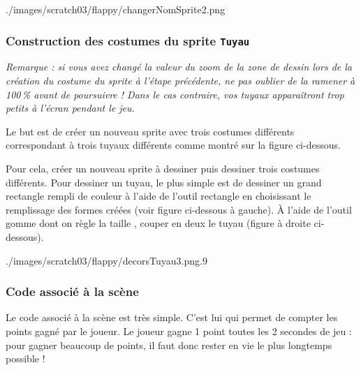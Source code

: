%
	      {./images/scratch03/flappy/changerNomSprite2.png}{\textwidth}


\subsubsection{Construction des costumes du sprite \texttt{Tuyau}}\label{costumesLutinTuyau} 

\emph{Remarque : si vous avez changé la valeur du zoom de la zone de dessin lors de la création du costume du sprite à l'étape précédente, ne pas oublier de la ramener à 100\,\% avant de poursuivre ! Dans le cas contraire, vos tuyaux apparaîtront trop petits à l'écran pendant le jeu.}

\vspace{6pt}

Le but est de créer un nouveau sprite avec trois costumes différents correspondant à trois tuyaux différents comme montré sur la figure ci-dessous.



Pour cela, créer un nouveau sprite à dessiner puis dessiner trois costumes différents. Pour dessiner un tuyau, le plus simple est de dessiner un grand rectangle rempli de couleur à l'aide de l'outil rectangle  en choisissant le remplissage des formes créées  (voir figure ci-dessous à gauche). À l'aide de l'outil gomme  dont on règle la taille , couper en deux le tuyau (figure à droite ci-dessous).  

%
	      {./images/scratch03/flappy/decorsTuyau3.png}{.9\textwidth}

 





\subsubsection{Code associé à la scène}

Le code associé à la scène est très simple. C'est lui qui permet de compter les points gagné par le joueur. Le joueur gagne 1 point toutes les 2 secondes de jeu : pour gagner beaucoup de points, il faut donc rester en vie le plus longtemps possible !

\vspace{6pt}

